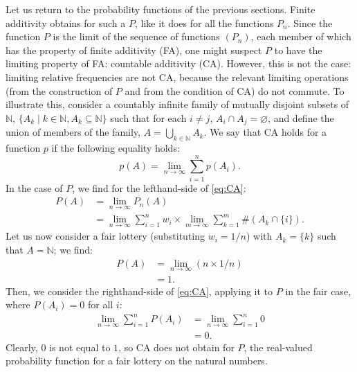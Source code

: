 Let us return to the probability functions of the previous sections. Finite additivity obtains for such a $P$, like it does for all the functions $P_n$. Since the function $P$ is the limit of the sequence of functions $\left( P_n \right)$, each member of which has the property of finite additivity (FA), one might suspect $P$ to have the limiting property of FA: countable additivity (CA). However, this is not the case: limiting relative frequencies are not CA, because the relevant limiting operations (from the construction of $P$ and from the condition of CA) do not commute. To illustrate this, consider a countably infinite family of mutually disjoint subsets of $\mathbb{N}$, $\{ A_k \mid k \in \mathbb{N}, A_k \subseteq \mathbb{N} \}$ such that for each $i \neq j$, $A_i \cap A_j = \varnothing$, and define the union of members of the family, $A = \bigcup_{k \in \mathbb{N}} A_k$. We say that CA holds for a function $p$ if the following equality holds:
\begin{equation}\label{eq:CA}
p(A) = \lim_{n \rightarrow \infty} \sum_{i=1}^{n} p(A_i).
\end{equation}
In the case of $P$, we find for the lefthand-side of \autoref{eq:CA}:
$$
\begin{aligned}
P(A) &= \lim_{n \rightarrow \infty} P_n(A)\\
     &= \lim_{n \rightarrow \infty} \sum_{i=1}^{n}w_i \times\lim_{m \rightarrow \infty}\sum_{k =1}^m \#(A_k \cap \{i\}).
\end{aligned}
$$
Let us now consider a fair lottery (substituting $w_i=1/n$) with $A_k=\{k\}$ such that $A=\mathbb{N}$; we find:
$$
\begin{aligned}
P(A) &=\lim_{n \rightarrow \infty} (n \times 1/n)\\
     &= 1.
\end{aligned}
$$
Then, we consider the righthand-side of \autoref{eq:CA}, applying it to $P$ in the fair case, where $P(A_i)=0$ for all $i$:
$$
\begin{aligned}
\lim_{n \rightarrow \infty} \sum_{i=1}^{n} P(A_i) &= \lim_{n \rightarrow \infty} \sum_{i=1}^{n} 0\\
  &= 0.
\end{aligned}
$$
Clearly, $0$ is not equal to $1$, so CA does not obtain for $P$, the real-valued probability function for a fair lottery on the natural numbers.

